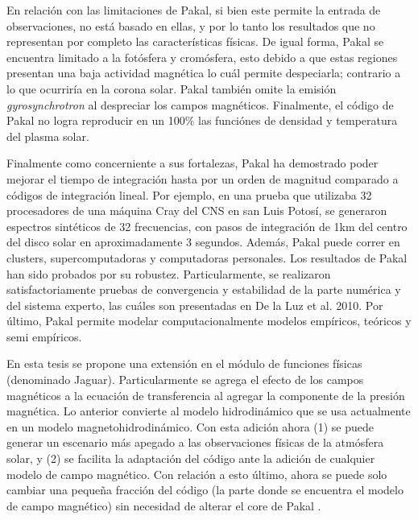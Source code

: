 \documentclass[9pt]{book}
\begin{document}
En relaci\'on con las limitaciones de Pakal, si bien este permite la entrada de observaciones, no est\'a basado en ellas, y por lo tanto los resultados que no representan por completo las caracter\'isticas f\'isicas. De igual forma, Pakal se encuentra limitado a la fot\'osfera y crom\'osfera, esto debido a que estas regiones presentan una baja actividad magn\'etica lo cu\'al permite despeciarla; contrario a lo que ocurrir\'ia en la corona solar. Pakal tambi\'en omite la emisi\'on \emph{gyrosynchrotron} al despreciar los campos magn\'eticos. Finalmente, el c\'odigo de Pakal no logra reproducir en un 100\% las funci\'ones de densidad y temperatura del plasma solar.
 
Finalmente como concerniente a sus fortalezas, Pakal ha demostrado poder mejorar el tiempo de integraci\'on hasta por un orden de magnitud comparado a c\'odigos de integraci\'on lineal. Por ejemplo, en una prueba que utilizaba 32 procesadores de una m\'aquina Cray del CNS en san Luis Potos\'i, se generaron espectros sint\'eticos de 32 frecuencias, con pasos de integraci\'on de 1km del centro del disco solar en aproximadamente 3 segundos. Adem\'as, Pakal puede correr en clusters, supercomputadoras y computadoras personales. Los resultados de Pakal han sido probados por su robustez. Particularmente, se realizaron satisfactoriamente pruebas de convergencia y estabilidad de la parte num\'erica y del sistema experto, las cu\'ales son presentadas en De la Luz et al. 2010. Por \'ultimo, Pakal permite modelar computacionalmente modelos emp\'iricos, te\'oricos y semi emp\'iricos. 

En esta tesis se propone una extensi\'on en el m\'odulo de funciones f\'isicas (denominado Jaguar). Particularmente se agrega el efecto de los campos magn\'eticos a la ecuaci\'on de transferencia al agregar la componente de la presi\'on magn\'etica. Lo anterior convierte al modelo hidrodin\'amico que se usa actualmente en un modelo magnetohidrodin\'amico. Con esta adici\'on ahora (1) se puede generar un escenario m\'as apegado a las observaciones f\'isicas de la atm\'osfera solar, y (2) se facilita la adaptaci\'on del c\'odigo ante la adici\'on de cualquier modelo de campo magn\'etico. Con relaci\'on a esto \'ultimo, ahora se puede solo cambiar una peque\~na fracci\'on del c\'odigo (la parte donde se encuentra el modelo de campo magn\'etico) sin necesidad de alterar el core de Pakal . 
\end{document}
